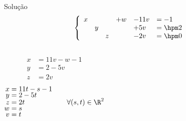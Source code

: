 \begin{resolution}{Solução}
  \[
    \left\{\begin{array}{llllll}
      x &   &   & + w & - 11v & = -1 \\
        & y &   &     & +  5v & = \hpm 2 \\
        &   & z &     & -  2v & = \hpm 0
    \end{array}\right.
  \]
  \pause
  \vspace{-\baselineskip}
  \begin{columns}[t]
    \begin{align*}
      x & = 11v - w -1 \\[-1.5ex]
      y & = 2 - 5v     \\[-1.5ex]
      z & = 2v
    \end{align*}
    \pause
    \begin{align*}
      x & = 11t - s - 1 \\[-1.5ex]
      y & = 2 - 5t      \\[-1.5ex]
      z & = 2t          \qquad\qquad\qquad \forall (s, t) \in \R^2 \\[-1.5ex]
      w & = s           \\[-1.5ex]
      v & = t
    \end{align*}
  \end{columns}
\end{resolution}

\endinput
